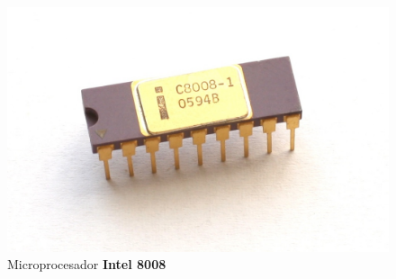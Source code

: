 \begin{figure}[htb]
	\centering
	\includegraphics[scale = 0.15]{Graphics/Intel_C8008-1.jpg}
	\caption{Microprocesador  \textbf{Intel 8008}}
	\label{fig:13}
\end{figure}






